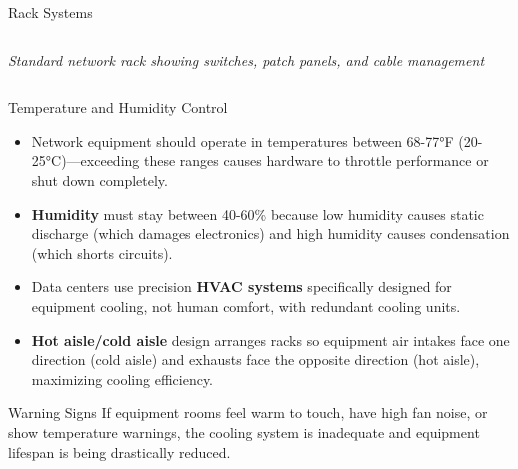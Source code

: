 \documentclass[aspectratio=169]{beamer}
\begin{document}
\begin{frame}{Rack Systems}
\begin{columns}[T]
\begin{column}{0.4\textwidth}
            \vspace{0.2cm}
            \small{\textit{Standard network rack showing switches, patch panels, and cable management}}
        \end{column}
    \end{columns}
\end{frame}

\begin{frame}{Temperature and Humidity Control}
    \begin{itemize}
        \item Network equipment should operate in temperatures between 68-77°F (20-25°C)---exceeding these ranges causes hardware to throttle performance or shut down completely.
        \item \textbf{Humidity} must stay between 40-60\% because low humidity causes static discharge (which damages electronics) and high humidity causes condensation (which shorts circuits).
        \item Data centers use precision \textbf{HVAC systems} specifically designed for equipment cooling, not human comfort, with redundant cooling units.
        \item \textbf{Hot aisle/cold aisle} design arranges racks so equipment air intakes face one direction (cold aisle) and exhausts face the opposite direction (hot aisle), maximizing cooling efficiency.
    \end{itemize}
    
    \vspace{0.3cm}
    \begin{block}{Warning Signs}
        If equipment rooms feel warm to touch, have high fan noise, or show temperature warnings, the cooling system is inadequate and equipment lifespan is being drastically reduced.
    \end{block}
\end{frame}
\end{document}
